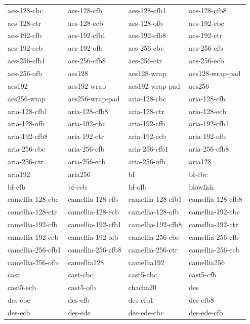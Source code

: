 \documentclass[a4paper, 12pt]{book} %
\begin{document}
\begin{table}[H]
\centering
\small
\begin{tabular}{llll}
\hline
aes-128-cbc & aes-128-cfb & aes-128-cfb1 & aes-128-cfb8 \\
aes-128-ctr & aes-128-ecb & aes-128-ofb & aes-192-cbc \\
aes-192-cfb & aes-192-cfb1 & aes-192-cfb8 & aes-192-ctr \\
aes-192-ecb & aes-192-ofb & aes-256-cbc & aes-256-cfb \\
aes-256-cfb1 & aes-256-cfb8 & aes-256-ctr & aes-256-ecb \\
aes-256-ofb & aes128 & aes128-wrap & aes128-wrap-pad \\
aes192 & aes192-wrap & aes192-wrap-pad & aes256 \\
aes256-wrap & aes256-wrap-pad & aria-128-cbc & aria-128-cfb \\
aria-128-cfb1 & aria-128-cfb8 & aria-128-ctr & aria-128-ecb \\
aria-128-ofb & aria-192-cbc & aria-192-cfb & aria-192-cfb1 \\
aria-192-cfb8 & aria-192-ctr & aria-192-ecb & aria-192-ofb \\
aria-256-cbc & aria-256-cfb & aria-256-cfb1 & aria-256-cfb8 \\
aria-256-ctr & aria-256-ecb & aria-256-ofb & aria128 \\
aria192 & aria256 & bf & bf-cbc \\
bf-cfb & bf-ecb & bf-ofb & blowfish \\
camellia-128-cbc & camellia-128-cfb & camellia-128-cfb1 & camellia-128-cfb8 \\
camellia-128-ctr & camellia-128-ecb & camellia-128-ofb & camellia-192-cbc \\
camellia-192-cfb & camellia-192-cfb1 & camellia-192-cfb8 & camellia-192-ctr \\
camellia-192-ecb & camellia-192-ofb & camellia-256-cbc & camellia-256-cfb \\
camellia-256-cfb1 & camellia-256-cfb8 & camellia-256-ctr & camellia-256-ecb \\
camellia-256-ofb & camellia128 & camellia192 & camellia256 \\
cast & cast-cbc & cast5-cbc & cast5-cfb \\
cast5-ecb & cast5-ofb & chacha20 & des \\
des-cbc & des-cfb & des-cfb1 & des-cfb8 \\
des-ecb & des-ede & des-ede-cbc & des-ede-cfb \\

\end{tabular}
\end{table}
\end{document}
